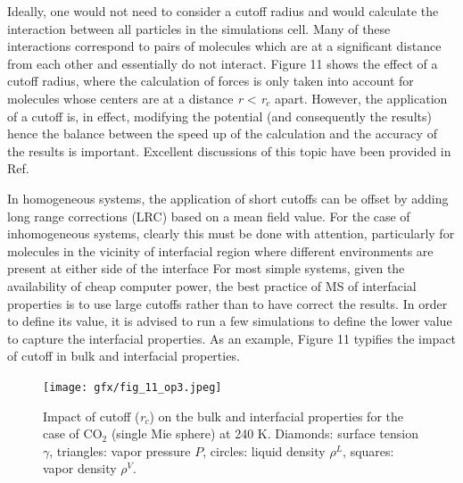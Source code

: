 \documentclass{scrbook}
\begin{document}
Ideally, one would not need to consider a cutoff radius and would calculate the
interaction between all particles in the simulations cell. Many of these
interactions correspond to pairs of molecules which are at a significant
distance from each other and essentially do not interact. Figure 11 shows the
effect of a cutoff radius, where the calculation of forces is only taken into
account for molecules whose centers are at a distance \textit{r} {\textless}
\textit{r}$_{c}$ apart. However, the application of a cutoff is, in effect,
modifying the potential (and consequently the results) hence the balance
between the speed up of the calculation and the accuracy of the results is
important. Excellent discussions of this topic have been provided in Ref.
\citep{holcomb1993,trokhymchuk1999,mecke1997,duque2004,blas2008}

In homogeneous systems, the application of short cutoffs can be offset by
adding long range corrections (LRC) based on a mean field value. For the case
of inhomogeneous systems, clearly this must be done with attention,
particularly for molecules in the vicinity of interfacial region where
different environments are present at either side of the interface
\citep{lotfi1990,janecek2006,siperstein2002,lishchuk2018}
For most simple systems, given the
availability of cheap computer power, the best practice of MS of interfacial
properties is to use large cutoffs rather than to have correct the results. In
order to define its value, it is advised to run a few simulations to define the
lower value to capture the interfacial properties. As an example, Figure 11
typifies the impact of cutoff in bulk and interfacial properties. 

\begin{figure}
  \centering
\texttt{[image: gfx/fig\_11\_op3.jpeg]}
\caption{Impact of cutoff (\textit{r}$_{c}$) on the bulk and interfacial properties for the case of CO$_{2}$ (single Mie sphere) at 240 K. Diamonds: surface tension $\gamma$, triangles: vapor pressure $P$, circles: liquid density $\rho^L$, squares: vapor density $\rho^V$.}
\label{fig:11}
\end{figure}
\end{document}
